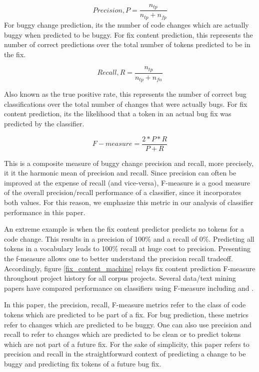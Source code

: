 \documentclass[10pt, conference, letterpaper, compsocconf]{IEEEtran}
\begin{document}
$$Precision, P = \dfrac{n_{tp}}{n_{tp} + n_{fp}}$$
   For buggy change prediction, its the number of code changes which are actually buggy when predicted to be buggy. For fix content prediction,
   this represents the number of correct predictions over the total number of tokens predicted to be in the fix.
   
$$Recall, R = \dfrac{n_{tp}}{n_{tp} + n_{fn}}$$

  Also known as the true positive rate, this represents the number of correct bug classifications over the total number
  of changes that were actually bugs. For fix content prediction, its the likelihood that a token in an actual bug fix was predicted by the classifier.
  
$$F-measure = \dfrac{2 *P* R} {P+R}$$

   This is a composite measure of buggy change precision and
recall, more precisely, it it the harmonic mean of precision and
recall. Since precision can often be improved at the expense of recall
(and vice-versa), F-measure is a good measure of the overall precision/recall
performance of a classifier, since it incorporates both values.
For this reason, we emphasize this metric in our analysis of 
classifier performance in this paper. 

An extreme example is when the fix content predictor predicts no tokens for a code change. This results in a precision of 100\% and a recall of 0\%. Predicting all tokens in a vocabulary leads to 100\% recall at huge cost to precision. Presenting the f-measure allows one to better understand the precision recall tradeoff. Accordingly, figure \ref{fix_content_machine} relays fix content prediction F-measure throughout project history for all corpus projects. Several data/text mining papers have compared performance on classifiers using F-measure including \cite{Anagnostopoulos2006p1049} and \cite{larsen1999fae}.

In this paper, the precision, recall, F-measure metrics refer to the class of code tokens which are predicted to be part of a fix. For bug prediction, these metrics refer to changes which are predicted to be buggy. One can also use precision and recall to refer to changes which are predicted to be clean or to predict tokens which are not part of a future fix. For the sake of simplicity, this paper refers to precision and recall in the straightforward context of predicting a change to be buggy and predicting fix tokens of a future bug fix.
\end{document}
